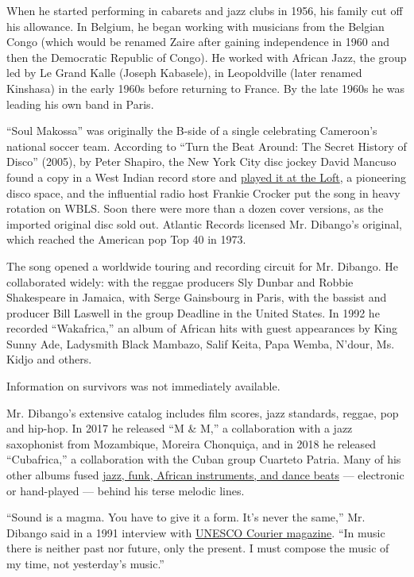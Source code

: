 When he started performing in cabarets and jazz clubs in 1956, his
family cut off his allowance. In Belgium, he began working with
musicians from the Belgian Congo (which would be renamed Zaire after
gaining independence in 1960 and then the Democratic Republic of Congo).
He worked with African Jazz, the group led by Le Grand Kalle (Joseph
Kabasele), in Leopoldville (later renamed Kinshasa) in the early 1960s
before returning to France. By the late 1960s he was leading his own
band in Paris.

``Soul Makossa'' was originally the B-side of a single celebrating
Cameroon's national soccer team. According to ``Turn the Beat Around:
The Secret History of Disco'' (2005), by Peter Shapiro, the New York
City disc jockey David Mancuso found a copy in a West Indian record
store and
\href{https://www.nytimes.com/2020/02/13/arts/music/love-saves-the-day-loft-playlist.html}{played
it at the Loft}, a pioneering disco space, and the influential radio
host Frankie Crocker put the song in heavy rotation on WBLS. Soon there
were more than a dozen cover versions, as the imported original disc
sold out. Atlantic Records licensed Mr. Dibango's original, which
reached the American pop Top 40 in 1973.

The song opened a worldwide touring and recording circuit for Mr.
Dibango. He collaborated widely: with the reggae producers Sly Dunbar
and Robbie Shakespeare in Jamaica, with Serge Gainsbourg in Paris, with
the bassist and producer Bill Laswell in the group Deadline in the
United States. In 1992 he recorded ``Wakafrica,'' an album of African
hits with guest appearances by King Sunny Ade, Ladysmith Black Mambazo,
Salif Keita, Papa Wemba, N'dour, Ms. Kidjo and others.

Information on survivors was not immediately available.

Mr. Dibango's extensive catalog includes film scores, jazz standards,
reggae, pop and hip-hop. In 2017 he released ``M \& M,'' a collaboration
with a jazz saxophonist from Mozambique, Moreira Chonquiça, and in 2018
he released ``Cubafrica,'' a collaboration with the Cuban group Cuarteto
Patria. Many of his other albums fused
\href{https://www.youtube.com/watch?\&v=zK69LoCTYus}{jazz, funk, African
instruments, and dance beats} --- electronic or hand-played --- behind
his terse melodic lines.

``Sound is a magma. You have to give it a form. It's never the same,''
Mr. Dibango said in a 1991 interview with
\href{https://en.unesco.org/courier/march-1991/interview-manu-dibango}{UNESCO
Courier magazine}. ``In music there is neither past nor future, only the
present. I must compose the music of my time, not yesterday's music.''

